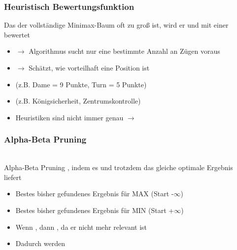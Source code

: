 \subsubsection*{Heuristisch Bewertungsfunktion}
Das der vollständige Minimax-Baum oft zu groß ist, wird er  und mit einer  bewertet\\
\begin{itemize}
    \item {} $\rightarrow$ Algorithmus sucht nur eine bestimmte Anzahl an Zügen voraus
    \item {} $\rightarrow$ Schätzt, wie vorteilhaft eine Position ist
\end{itemize}
\begin{itemize}
    \item {} (z.B. Dame = 9 Punkte, Turn = 5 Punkte)
    \item {} (z.B. Königsicherheit, Zentrumskontrolle)
\end{itemize}
\begin{itemize}
    \item Heuristiken sind nicht immer genau $\rightarrow$ 
\end{itemize}
\subsubsection*{Alpha-Beta Pruning}
\\
Alpha-Beta Pruning , indem es  und trotzdem das gleiche optimale Ergebnis liefert\\
\begin{itemize}
    \item {} Bestes bisher gefundenes Ergebnis für MAX (Start -$\infty$)
    \item {} Bestes bisher gefundenes Ergebnis für MIN (Start +$\infty$)
\end{itemize}
\begin{itemize}
    \item Wenn \fatsf{$\alpha \geq \beta$}, dann , da er nicht mehr relevant ist
    \item Dadurch werden 
\end{itemize}
